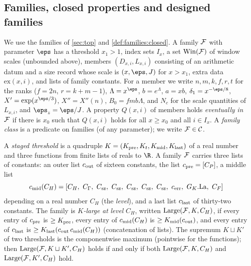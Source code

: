 \subsection{Families, closed properties and designed families}\label{sec:pf:top-shape:framework}

We use the families of \cref{sec:top} and \cref{def:families:closed}. A family $\mathcal{F}$ with parameter
$\eps$ has a threshold $x_1>1$, index sets $I_x$, a set $\mathrm{Win}(\mathcal{F})$ of window scales (unbounded
above), members $(D_{x,i},L_{x,i})$ consisting of an arithmetic datum and a size record whose scale is
$(x,\eps,J)$ for $x>x_1$, extra data $\mathrm{ex}(x,i)$, and lists of family constants. For a member we write
$n,m,k,f,r,t$ for the ranks ($f=2n$, $r=k+m-1$), $\Lambda=x^{\eps}$, $b=e^{\Lambda}$, $a=xb$,
$\delta_1=x^{-\eps/8}$, $X'=\exp(x^{\eps/3})$, $X''=X''(n)$, $B_0=fmb\Lambda$, and $N_c$ for the scale
quantities of $L_{x,i}$, and $\eps_z=\eps/J$. A property $Q(x,i)$ of members holds \emph{eventually in
$\mathcal{F}$} if there is $x_0$ such that $Q(x,i)$ holds for all $x\ge x_0$ and all $i\in I_x$. A
\emph{family class} is a predicate on families (of any parameter); we write $\mathcal{F}\in\mathcal C$.

\begin{definition}\label{pf:top-shape:large}
A \emph{staged threshold} is a quadruple $K=(K_{\rm pre},K_t,K_{\rm mid},K_{\rm last})$ of a real number and
three functions from finite lists of reals to $\R$. A family $\mathcal{F}$ carries three lists of constants: an
outer list $c_{\rm out}$ of sixteen constants, the list $c_{\rm pre}=[C_P]$, a middle list
\[
c_{\rm mid}(C_H)=[C_H,\ C_\Gamma,\ C_{\rm sz},\ C_{\rm sz},\ C_{\rm sz},\ C_{\rm sz},\ C_{\rm sz},\ c_{\rm err},\
G_K.\mathrm{La},\ C_F]
\]
depending on a real number $C_H$ (the \emph{level}), and a last list $c_{\rm last}$ of thirty-two constants.
The family is \emph{$K$-large at level $C_H$}, written $\mathrm{Large}(\mathcal{F},K,C_H)$, if every entry of
$c_{\rm pre}$ is $\ge K_{\rm pre}$, every entry of $c_{\rm mid}(C_H)$ is $\ge K_{\rm mid}(c_{\rm out})$, and
every entry of $c_{\rm last}$ is $\ge K_{\rm last}(c_{\rm out}\,c_{\rm mid}(C_H))$ (concatenation of lists).
The supremum $K\sqcup K'$ of two thresholds is the componentwise maximum (pointwise for the functions); then
$\mathrm{Large}(\mathcal{F},K\sqcup K',C_H)$ holds if and only if both $\mathrm{Large}(\mathcal{F},K,C_H)$ and
$\mathrm{Large}(\mathcal{F},K',C_H)$ hold.
\end{definition}

